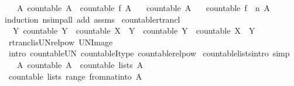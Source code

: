 \begin{isabellebody}
\ \ \ {\isachardoublequoteopen}{\isasymAnd}A{\isachardot}\ countable\ A\ {\isasymLongrightarrow}\ countable\ {\isacharparenleft}f\ A{\isacharparenright}{\isachardoublequoteclose}\isanewline
\ \ \ {\isachardoublequoteopen}countable\ A{\isachardoublequoteclose}\isanewline
\ \ \ {\isachardoublequoteopen}countable\ {\isacharparenleft}{\isacharparenleft}f\ {\isacharcircum}{\isacharcircum}\ n{\isacharparenright}\ A{\isacharparenright}{\isachardoublequoteclose}\isanewline
%
\isadelimproof
%
\endisadelimproof
%
\isatagproof
{}\isamarkupfalse%
{\isacharparenleft}induction\ n{\isacharparenright}{\isacharparenleft}simp{\isacharunderscore}all\ add{\isacharcolon}\ assms{\isacharparenright}%
\endisatagproof
{\isafoldproof}%
%
\isadelimproof
\isanewline
%
\endisadelimproof
\isanewline
{}\isamarkupfalse%
\ countable{\isacharunderscore}rtrancl{\isacharcolon}\isanewline
\ \ {\isachardoublequoteopen}{\isacharparenleft}{\isasymAnd}Y{\isachardot}\ countable\ Y\ {\isasymLongrightarrow}\ countable\ {\isacharparenleft}X\ {\isacharbackquote}{\isacharbackquote}\ Y{\isacharparenright}{\isacharparenright}\ {\isasymLongrightarrow}\ countable\ Y\ {\isasymLongrightarrow}\ countable\ {\isacharparenleft}X\isactrlsup {\isacharasterisk}\ {\isacharbackquote}{\isacharbackquote}\ Y{\isacharparenright}{\isachardoublequoteclose}\isanewline
%
\isadelimproof
\ \ %
\endisadelimproof
%
\isatagproof
{}\isamarkupfalse%
\ rtrancl{\isacharunderscore}is{\isacharunderscore}UN{\isacharunderscore}relpow\ UN{\isacharunderscore}Image\ \isamarkupfalse%
\ {\isacharparenleft}intro\ countable{\isacharunderscore}UN\ countableI{\isacharunderscore}type\ countable{\isacharunderscore}relpow{\isacharparenright}%
\endisatagproof
{\isafoldproof}%
%
\isadelimproof
\isanewline
%
\endisadelimproof
\isanewline
{}\isamarkupfalse%
\ countable{\isacharunderscore}lists{\isacharbrackleft}intro{\isacharcomma}\ simp{\isacharbrackright}{\isacharcolon}\isanewline
\ \ \ A{\isacharcolon}\ {\isachardoublequoteopen}countable\ A{\isachardoublequoteclose}\ \ {\isachardoublequoteopen}countable\ {\isacharparenleft}lists\ A{\isacharparenright}{\isachardoublequoteclose}\isanewline
%
\isadelimproof
%
\endisadelimproof
%
\isatagproof
{}\isamarkupfalse%
\ {\isacharminus}\isanewline
\ \ \isamarkupfalse%
\ {\isachardoublequoteopen}countable\ {\isacharparenleft}lists\ {\isacharparenleft}range\ {\isacharparenleft}from{\isacharunderscore}nat{\isacharunderscore}into\ A{\isacharparenright}{\isacharparenright}{\isacharparenright}{\isachardoublequoteclose}\isanewline

\end{isabellebody}
